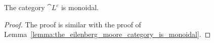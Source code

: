\begin{lemma}
  \label{lemma:the_eilenberg_moore_contraction_is_monoidal}
  The category $\cat{L}^c$ is monoidal.
\end{lemma}
\begin{proof}
  The proof is similar with the proof of Lemma~\ref{lemma:the_eilenberg_moore_category_is_monoidal}.
\end{proof}
